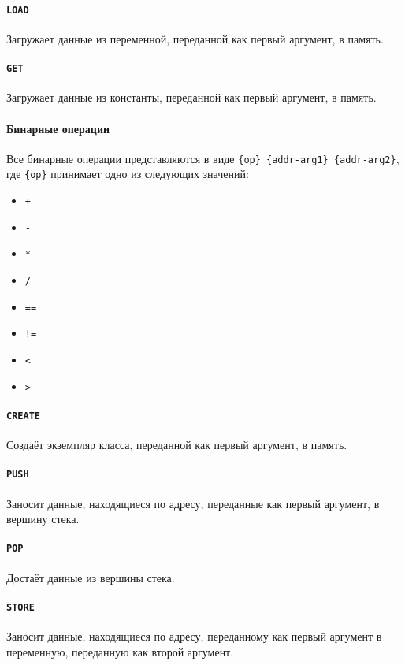 \documentclass[a4paper,12pt,notitlepage,pdftex]{scrreprt}
\begin{document}
    \paragraph{\verb"LOAD"} Загружает данные из переменной, переданной как первый аргумент, в память.
    \paragraph{\verb"GET"} Загружает данные из константы, переданной как первый аргумент, в память.
    \paragraph{Бинарные операции}
        Все бинарные операции представляются в виде \verb"{op} {addr-arg1} {addr-arg2}", где \verb"{op}" принимает
        одно из следующих значений:
    \begin{multicols}{4}
        \begin{itemize}
            \item \verb"+"
            \item \verb"-"
            \item \verb"*"
            \item \verb"/"
            \item \verb"=="
            \item \verb"!="
            \item \verb"<"
            \item \verb">"
        \end{itemize}
    \end{multicols}
    \paragraph{\verb"CREATE"} Создаёт экземпляр класса, переданной как первый аргумент, в память.
    \paragraph{\verb"PUSH"} Заносит данные, находящиеся по адресу, переданные как первый аргумент, в вершину стека.
    \paragraph{\verb"POP"} Достаёт данные из вершины стека.
    \paragraph{\verb"STORE"} Заносит данные, находящиеся по адресу, переданному как первый аргумент в переменную,
    переданную как второй аргумент.
\end{document}
